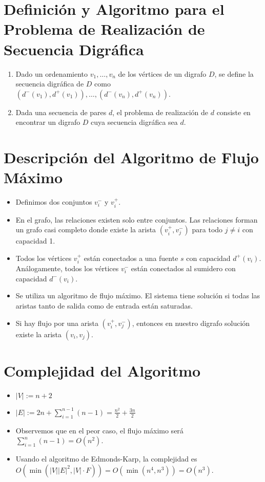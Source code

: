 \documentclass{article}
\begin{document}
\section*{Definición y Algoritmo para el Problema de Realización de Secuencia Digráfica}

\begin{enumerate}
  \item Dado un ordenamiento \( v_1, \ldots, v_n \) de los vértices de un digrafo \( D \), se define la secuencia digráfica de \( D \) como \( (d^-(v_1), d^+(v_1)), \ldots, (d^-(v_n), d^+(v_n)) \).
  \item Dada una secuencia de pares \( d \), el problema de realización de \( d \) consiste en encontrar un digrafo \( D \) cuya secuencia digráfica sea \( d \).
\end{enumerate}

\section*{Descripción del Algoritmo de Flujo Máximo}

\begin{itemize}
  \item Definimos dos conjuntos \( v_i^- \) y \( v_i^+ \).
  \item En el grafo, las relaciones existen solo entre conjuntos. Las relaciones forman un grafo casi completo donde existe la arista \( (v_i^+, v_j^-) \) para todo \( j \neq i \) con capacidad 1.
  \item Todos los vértices \( v_i^+ \) están conectados a una fuente \( s \) con capacidad \( d^+(v_i) \). Análogamente, todos los vértices \( v_i^- \) están conectados al sumidero con capacidad \( d^-(v_i) \).
  \item Se utiliza un algoritmo de flujo máximo. El sistema tiene solución si todas las aristas tanto de salida como de entrada están saturadas.
  \item Si hay flujo por una arista \( (v_i^+, v_j^-) \), entonces en nuestro digrafo solución existe la arista \( (v_i, v_j) \).
\end{itemize}





\section*{Complejidad del Algoritmo}

\begin{itemize}
  \item \( |V| := n + 2 \)
  \item \( |E| := 2n + \sum_{i=1}^{n-1} (n - 1) = \frac{n^2}{2} + \frac{3n}{2} \)
  \item Observemos que en el peor caso, el flujo máximo será \( \sum_{i=1}^{n} (n - 1) = O(n^2) \).
  \item Usando el algoritmo de Edmonds-Karp, la complejidad es \( O(\min(|V||E|^2, |V| \cdot F)) = O(\min(n^4, n^3)) = O(n^3) \).
\end{itemize}
\end{document}
